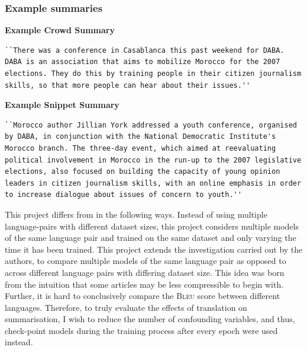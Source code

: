 \documentclass[12pt,a4paper,twoside,openright]{report}
\newcommand{\bleu}{\textsc{Bleu} }
\newcommand{\changedFont}[1]{{\fontfamily{qcr}\selectfont #1}}
\begin{document}
\subsubsection{Example summaries}
\textbf{Example Crowd Summary}
\begin{lstlisting}
``There was a conference in Casablanca this past weekend for DABA. DABA is an association that aims to mobilize Morocco for the 2007 elections. They do this by training people in their citizen journalism skills, so that more people can hear about their issues.''
\end{lstlisting}
\textbf{Example Snippet Summary}
\begin{lstlisting}
``Morocco author Jillian York addressed a youth conference, organised by DABA, in conjunction with the National Democratic Institute's Morocco branch. The three-day event, which aimed at reevaluating political involvement in Morocco in the run-up to the 2007 legislative elections, also focused on building the capacity of young opinion leaders in citizen journalism skills, with an online emphasis in order to increase dialogue about issues of concern to youth.''
\end{lstlisting}



This project differs from\cite{nguyen-daume-iii-2019-global} in the following ways. Instead of using multiple language-pairs with different dataset sizes, this project considers multiple models of the same language pair and trained on the same dataset and only varying the time it has been trained. This project extends the investigation carried out by the authors, to compare multiple models of the same language pair as opposed to across different language pairs with differing dataset size. This idea was born from the intuition that some articles may be less compressible to begin with. Further, it is hard to conclusively compare the \bleu score between different languages. Therefore, to truly evaluate the effects of translation on summarisation, I wish to reduce the number of confounding variables, and thus, check-point models during the training process after every epoch were used instead.
\end{document}
